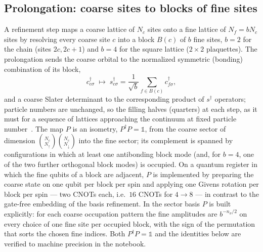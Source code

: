 \documentclass[
  aps,
  prc,
  reprint,
  superscriptaddress,
  floatfix,
  nofootinbib
]{revtex4-2}
\begin{document}
\subsection{Prolongation: coarse sites to blocks of fine sites}
\label{sec:prolong}
A refinement step maps a coarse lattice of $N_c$ sites onto a fine lattice of
$N_f=bN_c$ sites by resolving every coarse site $c$ into a block $B(c)$ of
$b$ fine sites, $b=2$ for the chain (sites $2c,2c+1$) and $b=4$ for the
square lattice ($2\times2$ plaquettes).  The prolongation sends the coarse
orbital to the normalized symmetric (bonding) combination of its block,
\begin{equation}
  c^\dagger_{c\sigma}\;\longmapsto\;
  s^\dagger_{c\sigma}=\frac{1}{\sqrt b}\sum_{f\in B(c)}c^\dagger_{f\sigma},
  \label{eq:bonding}
\end{equation}
and a coarse Slater determinant to the corresponding product of
$s^\dagger$ operators; particle numbers are unchanged, so the filling halves
(quarters) at each step, as it must for a sequence of lattices approaching
the continuum at fixed particle number~\cite{Bogner2026}.  The map
$P$ is an isometry, $P^\dagger P=\mathbb 1$, from the coarse sector of
dimension $\binom{N_c}{N_\uparrow}\binom{N_c}{N_\downarrow}$ into the fine
sector; its complement is spanned by configurations in which at least one
antibonding block mode (and, for $b=4$, one of the two further orthogonal
block modes) is occupied.  On a quantum register in which the fine qubits of a
block are adjacent, $P$ is implemented by preparing the coarse state on one
qubit per block per spin and applying one Givens rotation per block per spin
--- two CNOTs each, i.e.\ $16$ CNOTs for $4\to8$ --- in contrast to the
gate-free embedding of the basis refinement.  In the sector basis $P$ is built
explicitly: for each coarse occupation pattern the fine amplitudes are
$b^{-n_\sigma/2}$ on every choice of one fine site per occupied block, with
the sign of the permutation that sorts the chosen fine indices.  Both
$P^\dagger P=\mathbb1$ and the identities below are verified to machine
precision in the notebook.
\end{document}
